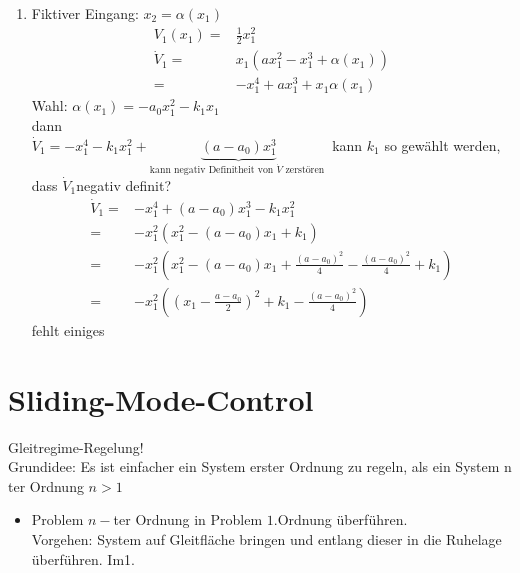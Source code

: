 \documentclass[ngerman]{tudscrreprt}
\begin{document}
\begin{enumerate}
\item Fiktiver Eingang: $x_2 = \alpha(x_1)$\\
\begin{align*}
V_1(x_1) = & \frac{1}{2}x_1^2\\
\dot V_1 = & x_1 (a x_1^2 - x_1^3 + \alpha(x_1) )\\
=& -x_1^4 + a x_1^3 + x_1 \alpha(x_1)
\end{align*}
Wahl: $\alpha(x_1) = -a_0 x_1^2 - k_1x_1$\\ dann\\ $\dot V_1 = -x_1^4 - k_1 x_1^2 + \underbrace{(a-a_0)x_1^3}_{\text{kann negativ Definitheit von $\dot V$ zerstören }}$
kann $k_1$ so gewählt werden, dass $\dot V_1 $negativ definit?\\
\begin{align*}
\dot V_1 = & -x_1^4 + (a-a_0)x_1^3 - k_1 x_1^2\\
=& -x_1^2(x_1^2 - (a-a_0) x_1 + k_1)\\
=&-x_1^2(x_1^2 - (a-a_0) x_1 + \frac{(a-a_0)^2}{4} - \frac{(a-a_0)^2}{4} + k_1)\\
=&-x_1^2\left( (x_1 - \frac{a-a_0}{2})^2+k_1 - \frac{(a-a_0)^2}{4} \right)
\end{align*}
fehlt einiges
\end{enumerate}
\chapter{Sliding-Mode-Control}
Gleitregime-Regelung!\\
Grundidee: Es ist einfacher ein System erster Ordnung zu regeln, als ein System n ter Ordnung $n>1$
\begin{itemize}
\item Problem $n-$ter Ordnung in Problem $1$.Ordnung überführen.\\
Vorgehen: System auf Gleitfläche bringen und entlang dieser in die Ruhelage überführen.
Im1.
\end{itemize}
\end{document}

